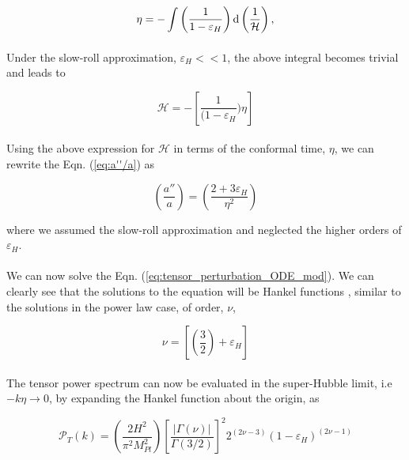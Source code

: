 \documentclass[12pt,a4paper,oneside]{book}
\begin{document}
\begin{equation}
\eta = -\int \left(\frac{1}{1-\varepsilon_H}\right){\rm d}\left(\frac{1}{\mathcal{H}}\right),
\end{equation}

\paragraph*{} Under the slow-roll approximation, $\varepsilon_H<<1$, the above 
integral becomes trivial and leads to 

\begin{equation}
\mathcal{H} = - \left[\frac{1}{(1-\varepsilon_H})\eta\right]
\end{equation}

\paragraph*{} Using the above expression for $\mathcal{H}$ in terms of the conformal time, 
$\eta$, we can rewrite the Eqn. (\ref{eq:a''/a}) as 

\begin{equation}
\left(\frac{a''}{a}\right) = \left(\frac{2+3\varepsilon_H}{\eta^2}\right)
\end{equation}

\noindent where we assumed the slow-roll approximation and 
neglected the higher orders of $\varepsilon_H$.

\paragraph*{} We can now solve the Eqn. (\ref{eq:tensor_perturbation_ODE_mod}). We can 
clearly see that the solutions to the equation will be Hankel functions \cite{DLMF}, similar to 
the solutions in the power law case, of order, $\nu$,

\begin{equation}
\nu = \left[\left(\frac{3}{2}\right)+\varepsilon_H\right]
\end{equation}

\paragraph*{} The tensor power spectrum can now be evaluated in the super-Hubble limit, 
i.e $-k\eta\rightarrow 0$, by expanding the Hankel function about the origin, as

\begin{equation}\label{eq:tps_slowroll}
\mathcal{P}_T(k) = \left(\frac{2H^2}{\pi^2M_{Pl}^2}\right)
\left[\frac{|\Gamma(\nu)|}{\Gamma(3/2)}\right]^2 2^{(2\nu-3)}(1-\varepsilon_H)^{(2\nu-1)}
\end{equation}
\end{document}
